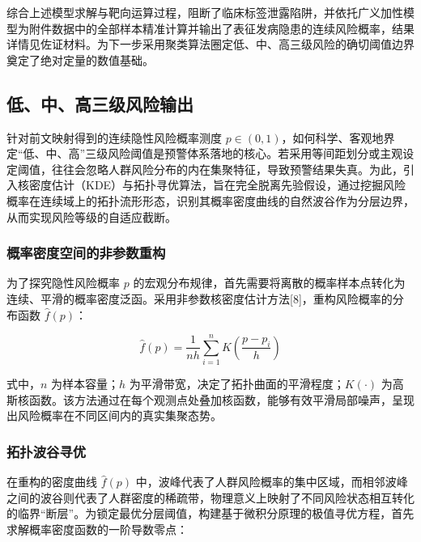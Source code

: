 \documentclass[12pt]{article}
\begin{document}
	{\songti{}
		综合上述模型求解与靶向运算过程，阻断了临床标签泄露陷阱，并依托广义加性模型为附件数据中的全部样本精准计算并输出了表征发病隐患的连续风险概率，结果详情见佐证材料。为下一步采用聚类算法圈定低、中、高三级风险的确切阈值边界奠定了绝对定量的数值基础。
		\par}
	
	\subsection{低、中、高三级风险输出}
	{\songti{}
		针对前文映射得到的连续隐性风险概率测度 $p \in (0,1)$，如何科学、客观地界定“低、中、高”三级风险阈值是预警体系落地的核心。若采用等间距划分或主观设定阈值，往往会忽略人群风险分布的内在集聚特征，导致预警结果失真。为此，引入核密度估计（KDE）与拓扑寻优算法，旨在完全脱离先验假设，通过挖掘风险概率在连续域上的拓扑流形形态，识别其概率密度曲线的自然波谷作为分层边界，从而实现风险等级的自适应截断。
		\par}
	
	\subsubsection{概率密度空间的非参数重构}
	
	{\songti{}
		为了探究隐性风险概率 $p$ 的宏观分布规律，首先需要将离散的概率样本点转化为连续、平滑的概率密度泛函。采用非参数核密度估计方法[8]，重构风险概率的分布函数 $\hat{f}(p)$：
		\par}
	
	\begin{equation}
		\hat{f}(p) = \frac{1}{nh} \sum_{i=1}^{n} K\left( \frac{p-p_i}{h} \right)
	\end{equation}
	
	{\songti{}
		式中，$n$ 为样本容量；$h$ 为平滑带宽，决定了拓扑曲面的平滑程度；$K(\cdot)$ 为高斯核函数。该方法通过在每个观测点处叠加核函数，能够有效平滑局部噪声，呈现出风险概率在不同区间内的真实集聚态势。
		\par}
	
	\subsubsection{拓扑波谷寻优}
	{\songti{}
		在重构的密度曲线 $\hat{f}(p)$ 中，波峰代表了人群风险概率的集中区域，而相邻波峰之间的波谷则代表了人群密度的稀疏带，物理意义上映射了不同风险状态相互转化的临界“断层”。为锁定最优分层阈值，构建基于微积分原理的极值寻优方程，首先求解概率密度函数的一阶导数零点：
		\par}
	
\end{document}

